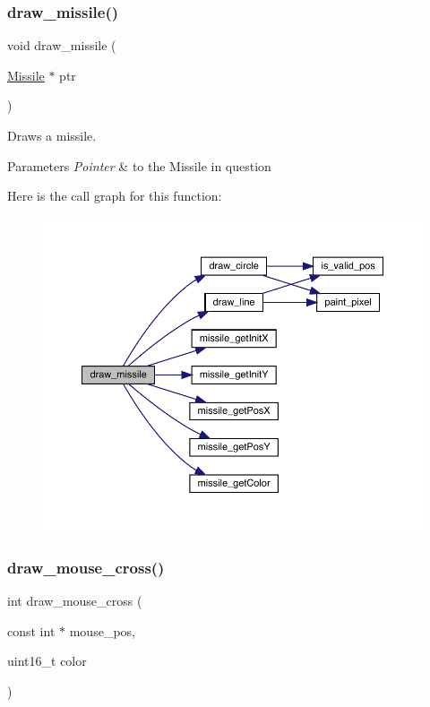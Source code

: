 \subsubsection{\texorpdfstring{draw\+\_\+missile()}{draw\_missile()}}
{\footnotesize\ttfamily void draw\+\_\+missile (\begin{DoxyParamCaption}\item[{\hyperlink{group___missile_ga7ea98f7c879356e5dfa41934529d86e1}{Missile} $\ast$}]{ptr }\end{DoxyParamCaption})}



Draws a missile. 


\begin{DoxyParams}{Parameters}
{\em Pointer} & to the Missile in question \\
\hline
\end{DoxyParams}
Here is the call graph for this function\+:\nopagebreak
\begin{figure}[H]
\begin{center}
\leavevmode
\includegraphics[width=350pt]{group__video__gr_ga4270ae09ddc191cdc0e767e4412c386a_cgraph}
\end{center}
\end{figure}
\hypertarget{group__video__gr_ga5cb0e000108ddc786148172ee56903c3}{}\label{group__video__gr_ga5cb0e000108ddc786148172ee56903c3} 
\subsubsection{\texorpdfstring{draw\+\_\+mouse\+\_\+cross()}{draw\_mouse\_cross()}}
{\footnotesize\ttfamily int draw\+\_\+mouse\+\_\+cross (\begin{DoxyParamCaption}\item[{const int $\ast$}]{mouse\+\_\+pos,  }\item[{uint16\+\_\+t}]{color }\end{DoxyParamCaption})}



